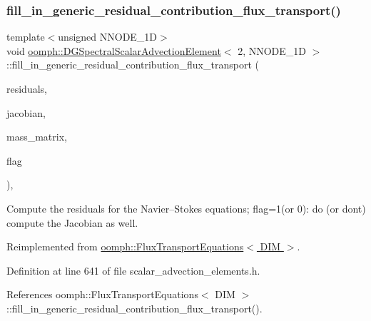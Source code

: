 \subsubsection{\texorpdfstring{fill\+\_\+in\+\_\+generic\+\_\+residual\+\_\+contribution\+\_\+flux\+\_\+transport()}{fill\_in\_generic\_residual\_contribution\_flux\_transport()}}
{\footnotesize\ttfamily template$<$unsigned N\+N\+O\+D\+E\+\_\+1D$>$ \\
void \hyperlink{classoomph_1_1DGSpectralScalarAdvectionElement}{oomph\+::\+D\+G\+Spectral\+Scalar\+Advection\+Element}$<$ 2, N\+N\+O\+D\+E\+\_\+1D $>$\+::fill\+\_\+in\+\_\+generic\+\_\+residual\+\_\+contribution\+\_\+flux\+\_\+transport (\begin{DoxyParamCaption}\item[{\hyperlink{classoomph_1_1Vector}{Vector}$<$ double $>$ \&}]{residuals,  }\item[{\hyperlink{classoomph_1_1DenseMatrix}{Dense\+Matrix}$<$ double $>$ \&}]{jacobian,  }\item[{\hyperlink{classoomph_1_1DenseMatrix}{Dense\+Matrix}$<$ double $>$ \&}]{mass\+\_\+matrix,  }\item[{unsigned}]{flag }\end{DoxyParamCaption})\hspace{0.3cm}{\ttfamily [inline]}, {\ttfamily [virtual]}}



Compute the residuals for the Navier--Stokes equations; flag=1(or 0)\+: do (or don\textquotesingle{}t) compute the Jacobian as well. 



Reimplemented from \hyperlink{classoomph_1_1FluxTransportEquations_a6994eab818eb7236e24e45b6fedec1f7}{oomph\+::\+Flux\+Transport\+Equations$<$ D\+I\+M $>$}.



Definition at line 641 of file scalar\+\_\+advection\+\_\+elements.\+h.



References oomph\+::\+Flux\+Transport\+Equations$<$ D\+I\+M $>$\+::fill\+\_\+in\+\_\+generic\+\_\+residual\+\_\+contribution\+\_\+flux\+\_\+transport().

\mbox{\label{classoomph_1_1DGSpectralScalarAdvectionElement_3_012_00_01NNODE__1D_01_4_a7a4facebbe8b314a1364472e66646e55}} 
